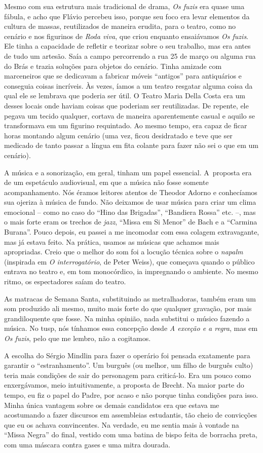 {Mesmo com sua estrutura mais tradicional de drama, {\it Os fuzis} era
quase uma fábula, e acho que Flávio percebeu isso, porque seu foco
era levar elementos da cultura de massas, reutilizados de
maneira erudita, para o teatro, como no cenário e nos figurinos de {\it Roda viva}, que
criou enquanto ensaiávamos {\it Os fuzis}. Ele tinha a capacidade de
refletir e teorizar sobre o seu trabalho, mas era antes de tudo um
artesão. Saía a campo percorrendo a rua 25 de março ou alguma rua do
Brás e trazia soluções para objetos do cenário. Tinha amizade com
marceneiros que se dedicavam a fabricar móveis “antigos” para
antiquários e conseguia coisas incríveis. Às vezes, íamos a um teatro
resgatar alguma coisa da qual ele se lembrava que poderia ser útil. O
Teatro Maria Della Costa era um desses locais onde haviam coisas que
poderiam ser reutilizadas. De repente, ele pegava um tecido qualquer,
cortava de maneira aparentemente casual e aquilo se transformava em um
figurino requintado. Ao mesmo tempo, era capaz de ficar horas montando
algum cenário (uma vez, ficou desidratado e teve que ser medicado de
tanto passar a língua em fita colante para fazer não sei o que em um
cenário).

A música e a sonorização, em geral, tinham um papel essencial. A~proposta
era de um espetáculo audiovisual, em que a música não fosse somente
acompanhamento. Nós éramos leitores atentos de Theodor Adorno e conhecíamos sua
ojeriza à música de fundo. Não deixamos de usar música para criar um
clima emocional -- como no caso do “Hino das Brigadas”,
“Bandiera Rossa” etc. --, mas o mais forte eram os trechos de
{\it jazz}, “Missa em Si Menor” de Bach e a “Carmina Burana”. Pouco
depois, eu passei a me incomodar com essa colagem extravagante, mas já
estava feito. Na prática, usamos as músicas que achamos mais
apropriadas. Creio que o melhor do som foi a locução técnica sobre
o {\it napalm} (inspirada em {\it O interrogatório}, de Peter Weiss), que
começava quando o público entrava no teatro e, em tom monocórdico, ia
impregnando o ambiente. No mesmo ritmo, os espectadores saíam do
teatro.

As matracas de Semana Santa, substituindo as metralhadoras, também eram um
som produzido ali mesmo, muito mais forte do que qualquer gravação, por
mais grandiloquente que fosse. Na minha opinião, nada substitui o músico
fazendo a música. No {\sc tusp}, nós tínhamos essa concepção desde {\it A
exceção e a regra}, mas em {\it Os fuzis}, pelo que me lembro, não a
cogitamos.

A escolha do Sérgio Mindlin para fazer o operário foi pensada
exatamente para garantir o “estranhamento”. Um burguês (ou melhor, um
filho de burguês culto) teria mais condições de sair do personagem para
criticá-lo. Era um pouco como enxergávamos, meio intuitivamente, a
proposta de Brecht. Na maior parte do tempo, eu fiz o papel do Padre, por
acaso e não porque tinha condições para isso. Minha única vantagem sobre
os demais candidatos era que estava me acostumando a fazer discursos em
assembleias estudantis, tão cheio de convicções que eu os achava convincentes.
Na verdade, eu me sentia mais à vontade na “Missa Negra” do final,
vestido com uma batina de bispo feita de borracha preta, com uma máscara
contra gases e uma mitra dourada.

}

